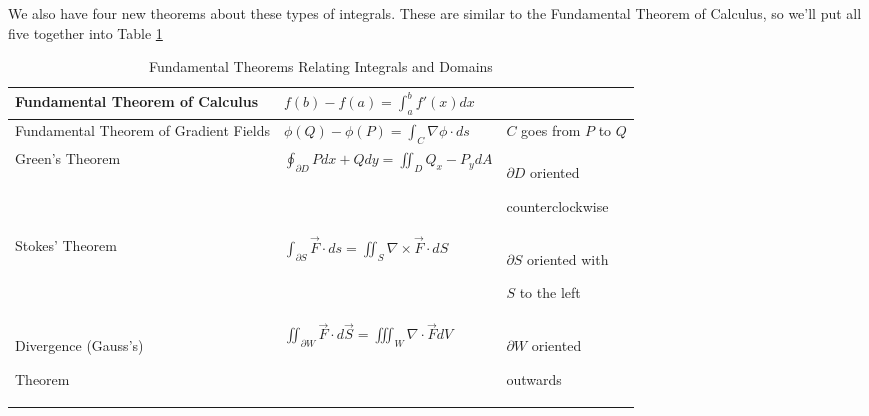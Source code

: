 \documentclass{amsart}
\newcommand{\Fvec}{\vec F}
\newcommand{\dd}{d}
\newcommand{\dA}{\dd A}
\newcommand{\ds}{\dd s}
\newcommand{\dS}{\dd S}
\newcommand{\dV}{\dd V}
\newcommand{\dx}{\dd x}
\newcommand{\dy}{\dd y}
\newcommand{\dSvec}{\dd\vec S}
\newcommand{\grad}{\nabla}
\begin{document}
We also have four new theorems about these types of integrals.
These are similar to the Fundamental Theorem of Calculus, so we'll put all five
together into Table \ref{tab:fundThms}
\begin{table}[!ht]
 \begin{tabular}{|p{.25\linewidth}|l|p{.2\linewidth}|}\hline
  Fundamental Theorem of Calculus & \vphantom{$\dfrac11$}
  $f(b)-f(a)=\int_a^b f'(x)\dx$ & \\\hline
  Fundamental Theorem of Gradient Fields & \vphantom{$\dfrac11$}
  $\phi(Q)-\phi(P)=\int_C\grad\phi\cdot\ds$ & $C$ goes from $P$ to $Q$ \\\hline
  Green's Theorem \vphantom{$\dfrac11$} &
  $\oint_{\partial D}P\dx+Q\dy=\iint_D Q_x-P_y\dA$ &
  $\partial D$ oriented\par counterclockwise \\\hline
  Stokes' Theorem \vphantom{$\dfrac11$} &
  $\int_{\partial S}\Fvec\cdot\ds=\iint_S\grad\times\Fvec\cdot\dS$ &
  $\partial S$ oriented with\par $S$ to the left \\\hline
  Divergence (Gauss's)\par Theorem & \vphantom{$\dfrac11$}
  $\iint_{\partial W}\Fvec\cdot\dSvec=\iiint_W\grad\cdot\Fvec\dV$ &
  $\partial W$ oriented\par outwards \\\hline
 \end{tabular}
 \caption{Fundamental Theorems Relating Integrals and Domains}
 \label{tab:fundThms}
\end{table}

%
\end{document}
